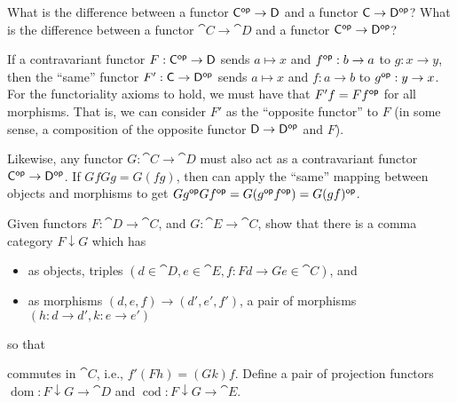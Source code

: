 \documentclass[notes,tikz]{agony}
\renewcommand{\C}{\cat{C}}
\newcommand{\D}{\cat{D}}
\newcommand{\E}{\cat{E}}
\newcommand{\comma}{\mathbin{\downarrow}}
\DeclareMathOperator{\dom}{dom}
\DeclareMathOperator{\cod}{cod}
\begin{document}
\begin{xca}
  What is the difference between a functor $\C\op \to \D$
  and a functor $\C \to \D\op$?
  What is the difference between a functor $\C \to \D$
  and a functor $\C\op \to \D\op$?
\end{xca}
\begin{sol}
  If a contravariant functor $F : \C\op \to \D$
  sends $a \mapsto x$ and $f^{\mathsf{op}} : b \to a$ to $g : x \to y$,
  then the ``same'' functor $F' : \C \to \D\op$
  sends $a \mapsto x$ and $f : a \to b$ to $g^{\mathsf{op}} : y \to x$.
  For the functoriality axioms to hold,
  we must have that $F' f = F f^{\mathsf{op}}$ for all morphisms.
  That is, we can consider $F'$ as the ``opposite functor'' to $F$
  (in some sense, a composition of the opposite functor $\D \to \D\op$ and $F$).

  Likewise, any functor $G : \C \to \D$
  must also act as a contravariant functor $\C\op \to \D\op$.
  If $GfGg = G(fg)$, then can apply the ``same'' mapping between objects and morphisms to get
  $Gg^{\mathsf{op}} Gf^{\mathsf{op}} = G(g^{\mathsf{op}} f^{\mathsf{op}}) = G(gf)^{\mathsf{op}}$.
\end{sol}

\begin{xca}\label{xca:comma}
  Given functors $F : \D \to \C$, and $G : \E \to \C$,
  show that there is a comma category $F \comma G$ which has
  \begin{itemize}[nosep]
    \item as objects, triples $(d \in \D, e \in \E, f : Fd \to Ge \in \C)$, and
    \item as morphisms $(d,e,f) \to (d',e',f')$, a pair of morphisms $(h : d \to d', k : e \to e')$
  \end{itemize}
  so that
  \begin{center}
  \end{center}
  commutes in $\C$, i.e., $f' (Fh) = (Gk) f$.
  Define a pair of projection functors $\dom : F \comma G \to \D$
  and $\cod : F \comma G \to \E$.
\end{xca}
\end{document}
